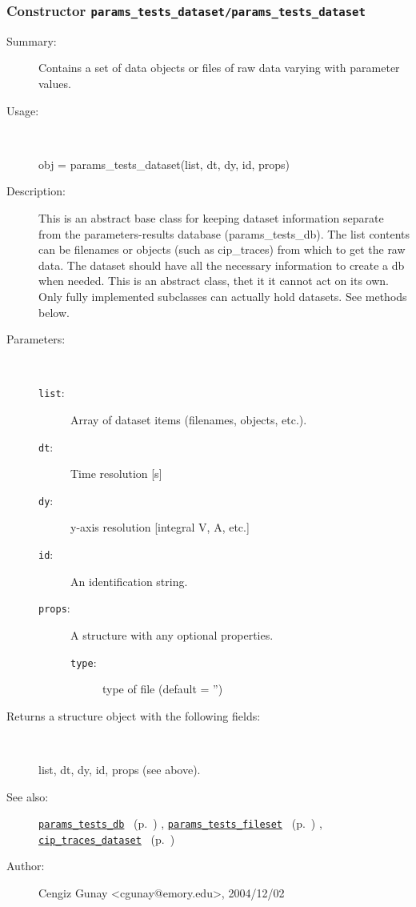\subsubsection[Constructor \texttt{params\_tests\_dataset}]{Constructor \texttt{params\_tests\_dataset/params\_tests\_dataset}}%
%
\label{ref_params_tests_dataset__params_tests_dataset}%
\hypertarget{ref_params_tests_dataset__params_tests_dataset}{}%
\begin{description}
\item[Summary:]Contains a set of data objects or files of raw data varying with parameter values.
%
\item[Usage:]~%
\begin{lyxcode}%
obj = params\_tests\_dataset(list, dt, dy, id, props)
%
\end{lyxcode}%
%
\item[Description:]%
This is an abstract base class for keeping dataset information separate
 from the parameters-results database (params\_tests\_db). The list contents
 can be filenames or objects (such as cip\_traces) from which to get the raw data.
 The dataset should have all the necessary information to create a db when
 needed. This is an abstract class, thet it it cannot act on its own. Only 
 fully implemented subclasses can actually hold datasets. See methods below.
\item[Parameters:]~
\begin{description}%
\item[\texttt{list}:]
 Array of dataset items (filenames, objects, etc.).
\item[\texttt{dt}:]
 Time resolution [s]
\item[\texttt{dy}:]
 y-axis resolution [integral V, A, etc.]
\item[\texttt{id}:]
 An identification string.
\item[\texttt{props}:]
 A structure with any optional properties.
\begin{description}%
\item[\texttt{type}:]
 type of file (default = '')
\end{description}%
\end{description}%
%
\item[Returns a structure object with the following fields:]~

	list, dt, dy, id, props (see above).
%
%
\item[See also:]%
\hyperlink{ref_params_tests_db}{\texttt{params\_tests\_db}}%
\ (p.~\pageref{ref_params_tests_db})%
%
, \hyperlink{ref_params_tests_fileset}{\texttt{params\_tests\_fileset}}%
\ (p.~\pageref{ref_params_tests_fileset})%
%
, \hyperlink{ref_cip_traces_dataset}{\texttt{cip\_traces\_dataset}}%
\ (p.~\pageref{ref_cip_traces_dataset})%
%
%
\item[Author:]%
Cengiz Gunay <cgunay@emory.edu>, 2004/12/02%
\end{description}
\methodline%
